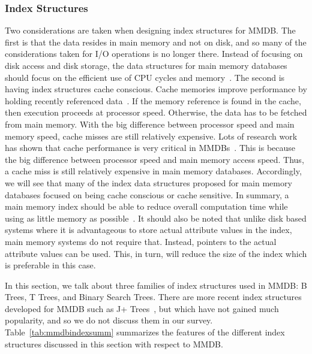 \documentclass[12pt,a4paper]{article}
\begin{document}
\subsubsection{Index Structures}

Two considerations are taken when designing index structures for MMDB. The first is that the data resides in main memory and not on disk, and so many of the
considerations taken for I/O operations is no longer there. Instead of focusing on disk access and disk storage, the data structures for main memory
databases should focus on the efficient use of CPU cycles and memory~\cite{lehman1986study}. The second is having index structures cache conscious. Cache
memories improve performance by holding recently referenced data~\cite{smith1982cache}. If the memory reference is found in the cache, then execution proceeds
at processor speed. Otherwise, the data has to be fetched from main memory. With the big difference between processor speed and main memory speed, cache misses
are still relatively expensive. Lots of research work has shown that cache performance is very critical in MMDBs~\cite{boncz1999database,rao1999cache}. This is
because the big difference between processor speed and main memory access speed. Thus, a cache miss is still relatively expensive in main memory databases.
Accordingly, we will see that many of the index data structures proposed for main memory databases focused on being cache conscious or cache sensitive. In
summary, a main memory index should be able to reduce overall computation time while using as little memory as possible~\cite{lehman1986study}. It should also
be noted that unlike disk based systems where it is advantageous to store actual attribute values in the index, main memory systems do not require that.
Instead, pointers to the actual attribute values can be used. This, in turn, will reduce the size of the index which is preferable in this case.

In this section, we talk about three families of index structures used in MMDB: B Trees, T Trees, and Binary Search Trees. There are more recent index
structures developed for MMDB such as J+ Trees~\cite{luan2009prefetching}, but which have not gained much popularity, and so we do not discuss them in our
survey. Table~\ref{tab:mmdbindexsumm} summarizes the features of the different index structures discussed in this section with respect to MMDB. 
\end{document}
